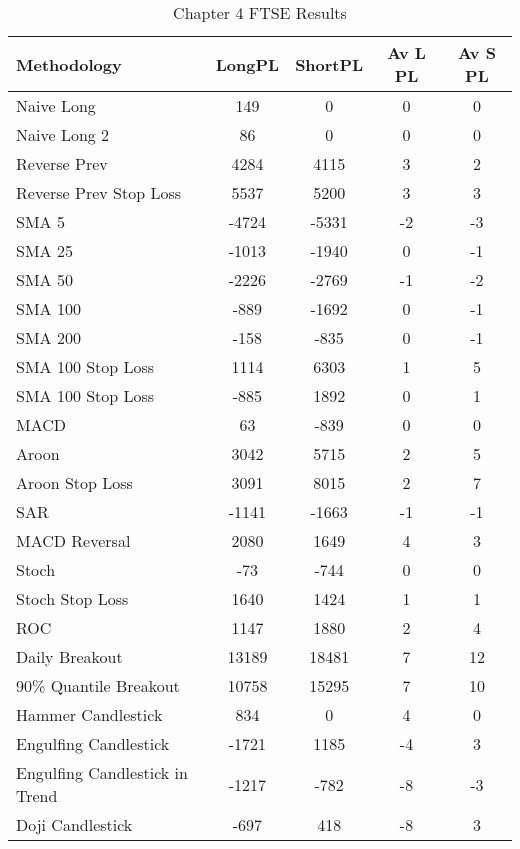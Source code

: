 \begin{table}[ht]
\centering
\caption[Chapter 4 FTSE Results]{Chapter 4 FTSE Results} 
\label{tab:chp6:ftse_summary}
\begin{tabular}{lcccc}
  \toprule Methodology & LongPL & ShortPL & Av L PL & Av S PL \\ 
  \midrule Naive Long & 149 & 0 & 0 & 0 \\ 
  Naive Long 2 & 86 & 0 & 0 & 0 \\ 
  Reverse Prev & 4284 & 4115 & 3 & 2 \\ 
  Reverse Prev Stop Loss & 5537 & 5200 & 3 & 3 \\ 
  SMA 5 & -4724 & -5331 & -2 & -3 \\ 
  SMA 25 & -1013 & -1940 & 0 & -1 \\ 
  SMA 50 & -2226 & -2769 & -1 & -2 \\ 
  SMA 100 & -889 & -1692 & 0 & -1 \\ 
  SMA 200 & -158 & -835 & 0 & -1 \\ 
  SMA 100 Stop Loss & 1114 & 6303 & 1 & 5 \\ 
  SMA 100 Stop Loss & -885 & 1892 & 0 & 1 \\ 
  MACD & 63 & -839 & 0 & 0 \\ 
  Aroon & 3042 & 5715 & 2 & 5 \\ 
  Aroon Stop Loss & 3091 & 8015 & 2 & 7 \\ 
  SAR & -1141 & -1663 & -1 & -1 \\ 
  MACD Reversal & 2080 & 1649 & 4 & 3 \\ 
  Stoch & -73 & -744 & 0 & 0 \\ 
  Stoch Stop Loss & 1640 & 1424 & 1 & 1 \\ 
  ROC & 1147 & 1880 & 2 & 4 \\ 
  Daily Breakout & 13189 & 18481 & 7 & 12 \\ 
  90\% Quantile Breakout & 10758 & 15295 & 7 & 10 \\ 
  Hammer Candlestick & 834 & 0 & 4 & 0 \\ 
  Engulfing Candlestick & -1721 & 1185 & -4 & 3 \\ 
  Engulfing Candlestick in Trend & -1217 & -782 & -8 & -3 \\ 
  Doji Candlestick & -697 & 418 & -8 & 3 \\ 
   \bottomrule \end{tabular}
\end{table}
